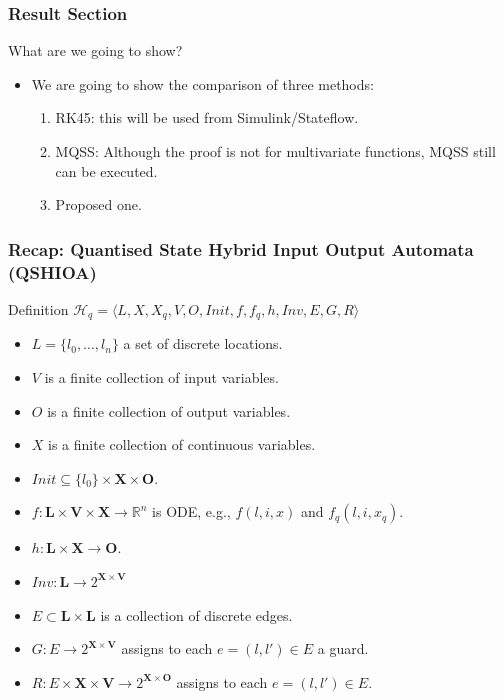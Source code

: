 \begin{frame}[c] \frametitle{Result Section}
	\begin{block}{What are we going to show?}
		\begin{itemize}
			\item We are going to show the comparison of three methods:
			\begin{enumerate}
				\item RK45: this will be used from Simulink/Stateflow.
				\item MQSS: Although the proof is not for multivariate functions, MQSS still can be executed.
				\item Proposed one.
			\end{enumerate}
		\end{itemize}
	\end{block}
\end{frame}

\begin{frame}[c] \frametitle{ Recap: Quantised State Hybrid Input Output Automata (QSHIOA) }
	\begin{block}{Definition}
		$\mathcal{H}_{q} = \langle L, X, X_q, V, O, Init, f, f_q, h, Inv, E,
		  G, R\rangle $
		\begin{itemize}
		\item $L = \{l_{0},\ldots,l_{n}\}$ a set of discrete locations.
		\item $V$ is a finite collection of input variables.
		\item $O$ is a finite collection of output variables.
		\item $X$ is a finite collection of continuous variables.
		\item $Init \subseteq \{l_0\} \times \mathbf{X} \times \mathbf{O}$.
		\item $f : \mathbf{L} \times \mathbf{V} \times \mathbf{X} \rightarrow \mathbb{R}^{n}$ is ODE, e.g., $f(l, i, x)$ and $f_{q}(l, i, x_{q})$.
		\item $h : \mathbf{L} \times \mathbf{X} \rightarrow \mathbf{O}$.
		\item $Inv: \mathbf{L} \rightarrow 2^{\mathbf{X} \times \mathbf{V} }$
		\item $E \subset \mathbf{L} \times \mathbf{L} $ is a collection of discrete edges.
		\item $G : E \rightarrow 2^{\mathbf{X} \times \mathbf{V}}$ assigns to each
		  $e = (l, l') \in E$ a guard.
		\item
		  $R : E \times \mathbf{X} \times \mathbf{V} \rightarrow 2^{\mathbf{X} \times \mathbf{O}}$
		  assigns to each $e = (l,l') \in E$.
		\end{itemize}
	\end{block}
\end{frame}

